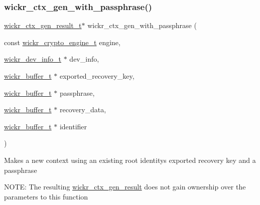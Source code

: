 \subsubsection{\texorpdfstring{wickr\+\_\+ctx\+\_\+gen\+\_\+with\+\_\+passphrase()}{wickr\_ctx\_gen\_with\_passphrase()}}
{\footnotesize\ttfamily \mbox{\hyperlink{structwickr__ctx__gen__result}{wickr\+\_\+ctx\+\_\+gen\+\_\+result\+\_\+t}}$\ast$ wickr\+\_\+ctx\+\_\+gen\+\_\+with\+\_\+passphrase (\begin{DoxyParamCaption}\item[{const \mbox{\hyperlink{structwickr__crypto__engine}{wickr\+\_\+crypto\+\_\+engine\+\_\+t}}}]{engine,  }\item[{\mbox{\hyperlink{structwickr__dev__info}{wickr\+\_\+dev\+\_\+info\+\_\+t}} $\ast$}]{dev\+\_\+info,  }\item[{\mbox{\hyperlink{structwickr__buffer}{wickr\+\_\+buffer\+\_\+t}} $\ast$}]{exported\+\_\+recovery\+\_\+key,  }\item[{\mbox{\hyperlink{structwickr__buffer}{wickr\+\_\+buffer\+\_\+t}} $\ast$}]{passphrase,  }\item[{\mbox{\hyperlink{structwickr__buffer}{wickr\+\_\+buffer\+\_\+t}} $\ast$}]{recovery\+\_\+data,  }\item[{\mbox{\hyperlink{structwickr__buffer}{wickr\+\_\+buffer\+\_\+t}} $\ast$}]{identifier }\end{DoxyParamCaption})}

Makes a new context using an existing root identity\textquotesingle{}s exported recovery key and a passphrase

N\+O\+TE\+: The resulting \mbox{\hyperlink{structwickr__ctx__gen__result}{wickr\+\_\+ctx\+\_\+gen\+\_\+result}} does not gain ownership over the parameters to this function


